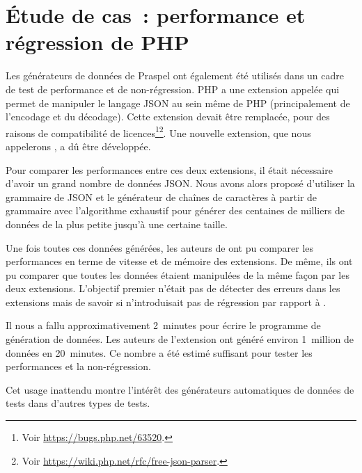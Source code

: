 \section{Étude de cas~: performance et régression de PHP}
\label{section:experimentation:php}

Les générateurs de données de Praspel ont également été utilisés dans un cadre
de test de performance et de non-régression. PHP a une extension appelée
 qui permet de manipuler le langage JSON au sein même de PHP
(principalement de l'encodage et du décodage). Cette extension devait être
remplacée, pour des raisons de compatibilité de licences\footnote{Voir
\url{https://bugs.php.net/63520}.}\footnote{Voir
\url{https://wiki.php.net/rfc/free-json-parser}.}. Une nouvelle extension, que
nous appelerons , a dû être développée.

Pour comparer les performances entre ces deux extensions, il était nécessaire
d'avoir un grand nombre de données JSON. Nous avons alors proposé d'utiliser la
grammaire de JSON et le générateur de chaînes de caractères à partir de
grammaire avec l'algorithme exhaustif pour générer des centaines de milliers de
données de la plus petite jusqu'à une certaine taille.

Une fois toutes ces données générées, les auteurs de  ont pu
comparer les performances en terme de vitesse et de mémoire des extensions. De
même, ils ont pu comparer que toutes les données étaient manipulées de la même
façon par les deux extensions. L'objectif premier n'était pas de détecter des
erreurs dans les extensions mais de savoir si  n'introduisait
pas de régression par rapport à .

Il nous a fallu approximativement 2~minutes pour écrire le programme de
génération de données. Les auteurs de l'extension ont généré environ 1~million
de données en 20~minutes. Ce nombre a été estimé suffisant pour tester les
performances et la non-régression.

Cet usage inattendu montre l'intérêt des générateurs automatiques de données de
tests dans d'autres types de tests.
